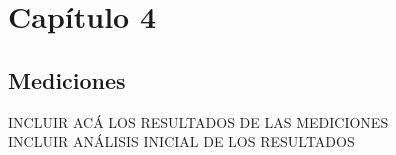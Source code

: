 \chapter{Capítulo 4}

\section{Mediciones}

INCLUIR ACÁ LOS RESULTADOS DE LAS MEDICIONES
\\
INCLUIR ANÁLISIS INICIAL DE LOS RESULTADOS